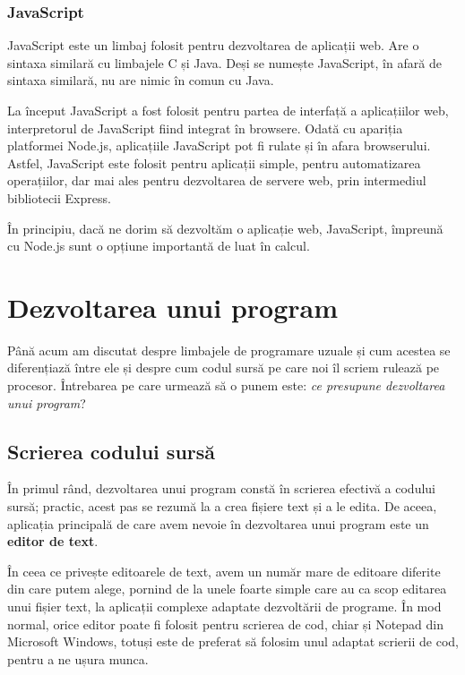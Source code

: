 \subsubsection{JavaScript}
\label{sec:appdev:hybrid-lang:js}

JavaScript este un limbaj folosit pentru dezvoltarea de aplicații web. Are o
sintaxa similară cu limbajele C și Java. Deși se numește JavaScript, în afară de
sintaxa similară, nu are nimic în comun cu Java.

La început JavaScript a fost folosit pentru partea de interfață a aplicațiilor
web, interpretorul de JavaScript fiind integrat în browsere. Odată cu apariția
platformei Node.js, aplicațiile JavaScript pot fi rulate și în afara
browserului. Astfel, JavaScript este folosit pentru aplicații simple, pentru
automatizarea operațiilor, dar mai ales pentru dezvoltarea de servere web, prin
intermediul bibliotecii Express.

În principiu, dacă ne dorim să dezvoltăm o aplicație web, JavaScript, împreună
cu Node.js sunt o opțiune importantă de luat în calcul.

\section{Dezvoltarea unui program}
\label{sec:appdev:dev}

Până acum am discutat despre limbajele de programare uzuale și cum acestea se
diferențiază între ele și despre cum codul sursă pe care noi îl scriem rulează
pe procesor. Întrebarea pe care urmează să o punem este: \textit{ce presupune
dezvoltarea unui program}?

\subsection{Scrierea codului sursă}
\label{sec:appdev:dev-stages:write}

În primul rând, dezvoltarea unui program constă în scrierea efectivă a codului
sursă; practic, acest pas se rezumă la a crea fișiere text și a le edita. De
aceea, aplicația principală de care avem nevoie în dezvoltarea unui program este
un \textbf{editor de text}.

În ceea ce privește editoarele de text, avem un număr mare de editoare diferite
din care putem alege, pornind de la unele foarte simple care au ca scop editarea
unui fișier text, la aplicații complexe adaptate dezvoltării de programe. În mod
normal, orice editor poate fi folosit pentru scrierea de cod, chiar și Notepad
din Microsoft Windows, totuși este de preferat să folosim unul adaptat scrierii
de cod, pentru a ne ușura munca.

